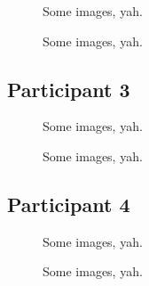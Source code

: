 \begin{figure}[h]
	\caption{Some images, yah.}
\end{figure}

\lipsum[1]

\clearpage

\begin{figure}[h]
	\caption{Some images, yah.}
\end{figure}

\lipsum[1]


\clearpage

\subsection{Participant 3}

\begin{figure}[h]
	\caption{Some images, yah.}
\end{figure}

\lipsum[1]

\clearpage

\begin{figure}[h]
	\caption{Some images, yah.}
\end{figure}

\lipsum[1]


\clearpage

\subsection{Participant 4}

\begin{figure}[h]
	\caption{Some images, yah.}
\end{figure}

\lipsum[1]

\clearpage

\begin{figure}[h]
	\caption{Some images, yah.}
\end{figure}

